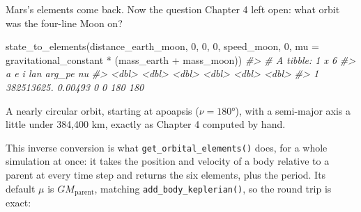 \documentclass[
  10.5pt,
  letterpaper,
]{scrbook}
\newenvironment{Shaded}{\begin{snugshade}}{\end{snugshade}}
\newcommand{\AttributeTok}[1]{\textcolor[rgb]{0.00,0.00,0.00}{#1}}
\newcommand{\CommentTok}[1]{\textcolor[rgb]{0.00,0.00,0.00}{\textit{#1}}}
\newcommand{\DecValTok}[1]{\textcolor[rgb]{0.00,0.00,0.00}{#1}}
\newcommand{\FunctionTok}[1]{\textcolor[rgb]{0.00,0.00,0.00}{#1}}
\newcommand{\NormalTok}[1]{\textcolor[rgb]{0.00,0.00,0.00}{#1}}
\newcommand{\SpecialCharTok}[1]{\textcolor[rgb]{0.00,0.00,0.00}{#1}}
\theoremstyle{definition}
\theoremstyle{plain}
\theoremstyle{remark}
\begin{document}
Mars's elements come back. Now the question Chapter 4 left open: what
orbit was the four-line Moon on?

\begin{Shaded}
\begin{Highlighting}[]
\FunctionTok{state\_to\_elements}\NormalTok{(distance\_earth\_moon, }\DecValTok{0}\NormalTok{, }\DecValTok{0}\NormalTok{, }\DecValTok{0}\NormalTok{, speed\_moon, }\DecValTok{0}\NormalTok{,}
                  \AttributeTok{mu =}\NormalTok{ gravitational\_constant }\SpecialCharTok{*}\NormalTok{ (mass\_earth }\SpecialCharTok{+}\NormalTok{ mass\_moon))}
\CommentTok{\#\textgreater{} \# A tibble: 1 x 6}
\CommentTok{\#\textgreater{}            a       e     i   lan arg\_pe    nu}
\CommentTok{\#\textgreater{}        \textless{}dbl\textgreater{}   \textless{}dbl\textgreater{} \textless{}dbl\textgreater{} \textless{}dbl\textgreater{}  \textless{}dbl\textgreater{} \textless{}dbl\textgreater{}}
\CommentTok{\#\textgreater{} 1 382513625. 0.00493     0     0    180   180}
\end{Highlighting}
\end{Shaded}

A nearly circular orbit, starting at apoapsis (\(\nu = 180°\)), with a
semi-major axis a little under 384,400 km, exactly as Chapter 4 computed
by hand.

This inverse conversion is what \texttt{get\_orbital\_elements()} does,
for a whole simulation at once: it takes the position and velocity of a
body relative to a parent at every time step and returns the six
elements, plus the period. Its default \(\mu\) is
\(GM_{\mathrm{parent}}\), matching \texttt{add\_body\_keplerian()}, so
the round trip is exact:
\end{document}
